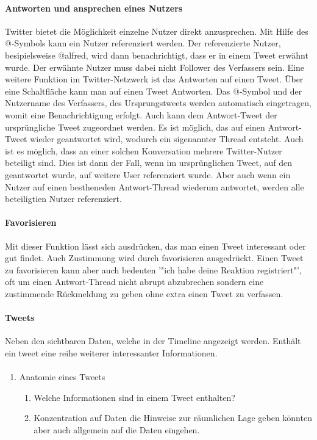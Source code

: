 

		\paragraph{Antworten und ansprechen eines Nutzers}
			Twitter bietet die Möglichkeit einzelne Nutzer direkt anzusprechen. 
			Mit Hilfe des @-Symbols kann ein Nutzer referenziert werden. 
			Der referenzierte Nutzer, besipielsweise @alfred, wird dann benachrichtigt, dass er in einem Tweet erwähnt wurde. 
			Der erwähnte Nutzer muss dabei nicht Follower des Verfassers sein.
			Eine weitere Funktion im Twitter-Netzwerk ist das Antworten auf einen Tweet.
			Über eine Schaltfläche kann man auf einen Tweet Antworten. 
			Das @-Symbol und der Nutzername des Verfassers, des Ursprungstweets werden automatisch eingetragen, womit eine Benachrichtigung erfolgt. 
			Auch kann dem Antwort-Tweet der ursprüngliche Tweet zugeordnet werden.
			Es ist möglich, das auf einen Antwort-Tweet wieder geantwortet wird, wodurch ein sigenannter Thread entsteht. 
			Auch ist es möglich, dass an einer solchen Konversation mehrere Twitter-Nutzer beteiligt sind. 
			Dies ist dann der Fall, wenn im ursprünglichen Tweet, auf den geantwortet wurde, auf weitere User referenziert wurde. 
			Aber auch wenn ein Nutzer auf einen bestheneden Antwort-Thread wiederum antwortet, werden alle beteiligtien Nutzer referenziert. 


		\paragraph{Favorisieren}
			Mit dieser Funktion lässt sich ausdrücken, das man einen Tweet interessant oder gut findet.
			Auch Zustimmung wird durch favorisieren ausgedrückt.  
			Einen Tweet zu favorisieren kann aber auch bedeuten '"ich habe deine Reaktion registriert"', oft um einen Antwort-Thread nicht abrupt abzubrechen sondern eine zustimmende Rückmeldung zu geben ohne extra einen Tweet zu verfassen.

 		
	 	\paragraph{Tweets}
	 		Neben den sichtbaren Daten, welche in der Timeline angezeigt werden. 
	 		Enthält ein tweet eine reihe weiterer interessanter Informationen. 
	 		  
	 		
	 	\paragraph{}
	 	\begin{enumerate}
	 		 \item Anatomie eines Tweets 
					\begin{enumerate}
						\item Welche Informationen sind in einem Tweet enthalten? 
						\item Konzentration auf Daten die Hinweise zur räumlichen Lage geben könnten aber auch allgemein auf die Daten eingehen.
					\end{enumerate}
	 	\end{enumerate}
			

